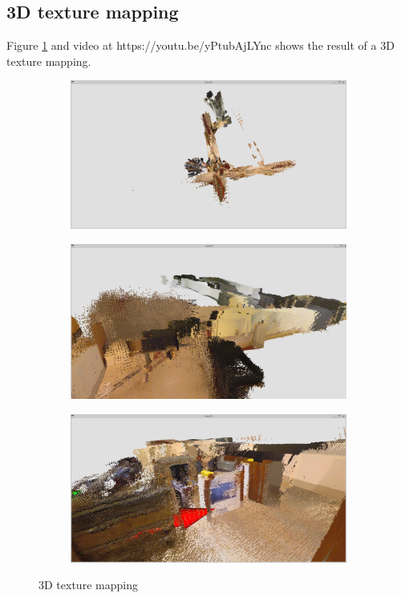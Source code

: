 \documentclass[conference]{IEEEtran}
\begin{document}
\subsection{3D texture mapping}
Figure \ref*{fig:3d_map} and video at https://youtu.be/yPtubAjLYnc
shows the result of a 3D texture mapping.

\begin{figure}
    \begin{subfigure}{0.3\textwidth}
        \includegraphics[width=\linewidth]{../img/3D_0.png}
    \end{subfigure}
    \hfill
    \begin{subfigure}{0.3\textwidth}
        \includegraphics[width=\linewidth]{../img/3D_1.png}
    \end{subfigure}
    \hfill
    \begin{subfigure}{0.3\textwidth}
        \includegraphics[width=\linewidth]{../img/3D_2.png}
    \end{subfigure}
    
    \caption{3D texture mapping}
    \label{fig:3d_map}
\end{figure}
\end{document}
